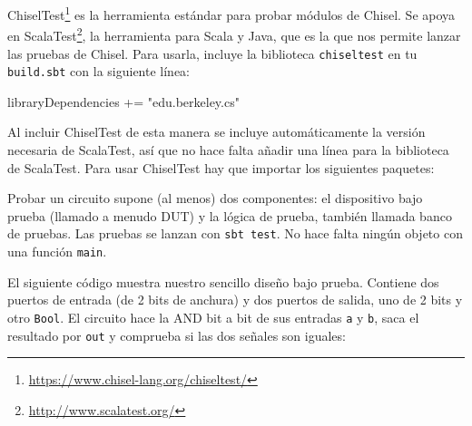 \documentclass[%
    10pt,
    headinclude, footinclude=false,
    openright, %
    notitlepage,
    cleardoublepage=empty,
    headsepline,
    numbers=noenddot,
    bibliography=totoc, index=totoc,
    ]{scrbook}
\newcommand{\code}[1]{{\lstinline[basicstyle=\small\ttfamily]{#1}}}
\newcommand{\myref}[2]{\href{#1}{#2}}
\renewcommand{\myref}[2]{{#2}{\footnote{\url{#1}}}}
\begin{document}
\myref{https://www.chisel-lang.org/chiseltest/}{ChiselTest} es la herramienta estándar para probar
módulos de Chisel. Se apoya en \myref{http://www.scalatest.org/}{ScalaTest}, la herramienta para Scala
y Java, que es la que nos permite lanzar las pruebas de Chisel.
Para usarla, incluye la biblioteca \code{chiseltest} en tu \code{build.sbt} con la siguiente línea:

\begin{chisel}
libraryDependencies += "edu.berkeley.cs" %
\end{chisel}


\noindent Al incluir ChiselTest de esta manera se incluye automáticamente la versión necesaria de
ScalaTest, así que no hace falta añadir una línea para la biblioteca de ScalaTest.
Para usar ChiselTest hay que importar los siguientes paquetes:



\noindent Probar un circuito supone (al menos) dos componentes: el dispositivo bajo prueba (llamado
a menudo DUT) y la lógica de prueba, también llamada banco de pruebas. Las pruebas se lanzan con
\code{sbt test}. No hace falta ningún objeto con una función \code{main}.


El siguiente código muestra nuestro sencillo diseño bajo prueba. Contiene dos puertos de entrada
(de 2 bits de anchura) y dos puertos de salida, uno de 2 bits y otro \code{Bool}. El circuito hace la AND
bit a bit de sus entradas \code{a} y \code{b}, saca el resultado por \code{out} y comprueba si las dos
señales son iguales:

\end{document}
